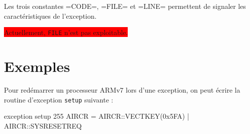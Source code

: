 Les trois constantes \plm=CODE=, \plm=FILE= et \plm=LINE= permettent de signaler les caractéristiques de l'exception.

\colorbox{red}{Actuellement, \texttt{FILE} n'est pas exploitable.}

\section{Exemples}

Pour redémarrer un processeur ARMv7 lors d'une exception, on peut écrire la routine d'exception \texttt{setup} suivante :
\begin{PLM}
exception setup 255 {
  AIRCR = AIRCR::VECTKEY(0x5FA) | AIRCR::SYSRESETREQ
}
\end{PLM}
